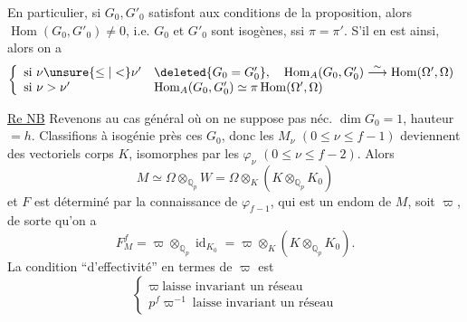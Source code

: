 
En particulier, si $G_0,G'_0$ satisfont aux conditions de la proposition, alors $\operatorname{Hom}(G_0,G'_0)\ne0$, i.e. $G_0$ et $G'_0$ sont isogènes, ssi $\pi=\pi'$.  S'il en est ainsi, alors  on a
\[
\left\{\begin{array}{ll}
\text{si }\nu\unsure{\leq|<}\nu'&\deleted{G_0=G'_0},\quad\operatorname{Hom}_A(G_0,G'_0)\overset\sim\longrightarrow\operatorname{Hom}(\Omega',\Omega)\\
\text{si }\nu>\nu'&\operatorname{Hom}_A(G_0,G'_0)\simeq\pi\operatorname{Hom}(\Omega',\Omega)
\end{array}\right.
\]

\uline{Re NB} Revenons au cas général où on ne suppose pas néc. $\dim G_0=1$,   hauteur $=h$. Classifions à isogénie près  ces $G_0$, donc les $M_\nu$ $(0\leq\nu\leq f-1)$ deviennent des vectoriels  corps $K$, isomorphes par les $\varphi_\nu$ $(0\leq\nu\leq f-2)$. Alors
\[
M\simeq\Omega\otimes_{\mathbb Q_p}W=\Omega\otimes_K(K\otimes_{\mathbb Q_p}K_0)
\]
et $F$ est déterminé par la connaissance de $\varphi_{f-1}$, qui est un endom de $M$, soit $\varpi$, de sorte qu'on a
\[
F_M^f=\varpi\otimes_{\mathbb Q_p}\operatorname{id}_{K_0}=\varpi\otimes_K(K\otimes_{\mathbb Q_p}K_0).
\]
La condition ``d'effectivité'' en termes de $\varpi$ est
\[
\left\{\begin{array}{l}
\varpi\ \text{laisse invariant un réseau}\\
p^f\varpi^{-1}\ \text{laisse invariant un réseau}
\end{array}\right.
\]
